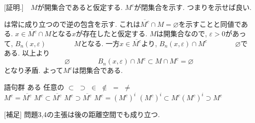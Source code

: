 \documentclass[dvipdfmx,a4paper,11pt]{article}
\newcommand{\R}{\mathbb{R}}
\theoremstyle{definition}
\begin{document}
 [証明.]　$M$が開集合であると仮定する. $M^c$が閉集合を示す. 
 つまり\boxed{\phantom{hogehoge}}を示せば良い. 
 
\boxed{\phantom{hogehoge}}は常に成り立つので逆の包含を示す.
これは$\overline{M^c} \cap M = \varnothing$を示すことと同値である. 
$x \in \overline{M^c} \cap M$となる$x$が存在したと仮定する.
$M$は開集合なので, \boxed{\phantom{hogehoge}}$\varepsilon >0$があって, $B_{n}(x, \varepsilon)\boxed{\phantom{hogehoge}}M$となる. 
一方$x \in \overline{M^c}$より, $B_{n}(x, \varepsilon) \cap M^c \boxed{\phantom{hogehoge}}\varnothing$である.
以上より
$$
\varnothing \boxed{\phantom{hogehoge}} B_{n}(x, \varepsilon) \cap M^c 
\subset M \cap M^c = \varnothing
$$
となり矛盾. 
よって$M^c$は閉集合である.
  
    \begin{itembox}[l]{語句群}
ある \quad 任意の  \quad  $\subset$ \quad $\supset$
\quad $\in$ \quad $\not\in$ \quad $=$ \quad $\neq$　 \\ 
$M^c = \overline{M^c}$ \quad $M^c \subset \overline{M^c}$ \quad$ M^c \supset \overline{M^c}$ \quad 
$M^c = (M^c)^i$ \quad $(M^c)^i \subset M^c $\quad$ (M^c)^i \supset M^c$
\end{itembox}


 [補足] 問題3,4の主張は後の距離空間でも成り立つ. 
 
\end{document}
